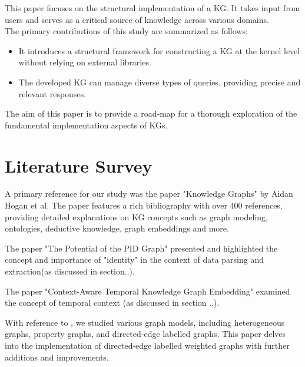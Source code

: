 \documentclass[conference]{IEEEtran}
\begin{document}
This paper focuses on the structural implementation of a KG. It takes input from users and serves as a critical source of knowledge across various domains. 
\\
The primary contributions of this study are summarized as follows:

\begin{itemize}
    \item It introduces a structural framework for constructing a KG at the kernel level without relying on external libraries.
    \item The developed KG can manage diverse types of queries, providing precise and relevant responses.
\end{itemize}
The aim of this paper is to provide a road-map for a thorough exploration of the fundamental implementation aspects of KGs.


\section{Literature Survey}

A primary reference for our study was the paper "Knowledge Graphs"\cite{b8} by Aidan Hogan et al. The paper features a rich bibliography with over 400 references, providing detailed explanations on KG concepts such as graph modeling, ontologies, deductive knowledge, graph embeddings and more. 

The paper "The Potential of the PID Graph" \cite{b16} presented and highlighted the concept and importance of "identity" in the context of data parsing and extraction(as discussed in section..).

The paper "Context-Aware Temporal Knowledge Graph Embedding" \cite{b17} examined the concept of temporal context (as discussed in section ..).


With reference to \cite{b8}, we studied various graph models, including heterogeneous graphs\cite{b18}, property graphs\cite{b12}, and directed-edge labelled graphs\cite{b8}. This paper delves into the implementation of directed-edge labelled weighted graphs with further additions and improvements.
\end{document}
